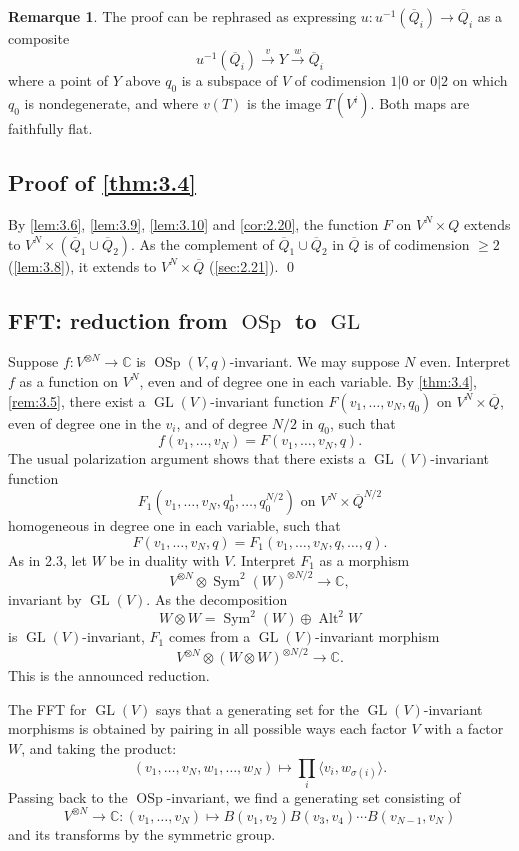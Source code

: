 \documentclass[11pt,a4paper]{article}
\theoremstyle{plain}
\theoremstyle{definition}
\newtheorem{remark}[theorem]{Remarque}
\DeclareMathOperator{\GL}{GL}
\DeclareMathOperator{\OSp}{OSp}
\DeclareMathOperator{\Alt}{Alt}
\DeclareMathOperator{\Sym}{Sym}
\newcommand{\C}{\mathbb{C}}
\begin{document}
\begin{remark}\label{rem:3.11}
The proof can be rephrased as expressing $u: u^{-1}(\overline{Q}_i) \to \overline{Q}_i$ as a composite
\[
u^{-1}(\overline{Q}_i) \xrightarrow{v} Y \xrightarrow{w} \overline{Q}_i
\]
where a point of $Y$ above $q_0$ is a subspace of $V$ of codimension $1|0$ or $0|2$ on which $q_0$ is nondegenerate, and where $v(T)$ is the image $T(V^i)$. Both maps are faithfully flat.
\end{remark}

\subsection{Proof of \ref{thm:3.4}}
\label{sec:3.12}
By \ref{lem:3.6}, \ref{lem:3.9}, \ref{lem:3.10} and \ref{cor:2.20}, the function $F$ on $V^N \times Q$ extends to $V^N \times (\overline{Q}_1 \cup \overline{Q}_2)$. As the complement of $\overline{Q}_1 \cup \overline{Q}_2$ in $\overline{Q}$ is of codimension $\geq 2$ (\ref{lem:3.8}), it extends to $V^N \times \overline{Q}$ (\ref{sec:2.21}).
\qed

\subsection{FFT: reduction from $\OSp$ to $\GL$}
\label{sec:3.13}
Suppose $f : V^{\otimes N} \to \C$ is $\OSp(V,q)$-invariant. We may suppose $N$ even. Interpret $f$ as a function on $V^N$, even and of degree one in each variable. By \ref{thm:3.4}, \ref{rem:3.5}, there exist a $\GL(V)$-invariant function $F(v_1,\dots,v_N, q_0)$ on $V^N \times \overline{Q}$, even of degree one in the $v_i$, and of degree $N/2$ in $q_0$, such that
\[
f(v_1,\dots,v_N) = F(v_1,\dots,v_N, q).
\]
The usual polarization argument shows that there exists a $\GL(V)$-invariant function
\[
F_1(v_1,\dots,v_N, q_0^1,\dots,q_0^{N/2}) \text{ on } V^N \times \overline{Q}^{N/2}
\]
homogeneous in degree one in each variable, such that
\[
F(v_1,\dots,v_N, q) = F_1(v_1,\dots,v_N, q, \dots, q).
\]
As in 2.3, let $W$ be in duality with $V$. Interpret $F_1$ as a morphism
\[
V^{\otimes N} \otimes \Sym^2(W)^{\otimes N/2} \to \C,
\]
invariant by $\GL(V)$. As the decomposition
\[
W \otimes W = \Sym^2(W) \oplus \Alt^2 W
\]
is $\GL(V)$-invariant, $F_1$ comes from a $\GL(V)$-invariant morphism
\[
V^{\otimes N} \otimes (W \otimes W)^{\otimes N/2} \to \C.
\]
This is the announced reduction.

The FFT for $\GL(V)$ says that a generating set for the $\GL(V)$-invariant morphisms is obtained by pairing in all possible ways each factor $V$ with a factor $W$, and taking the product:
\[
(v_1,\dots,v_N, w_1,\dots,w_N) \mapsto \prod_i \langle v_i, w_{\sigma(i)} \rangle.
\]
Passing back to the $\OSp$-invariant, we find a generating set consisting of
\[
V^{\otimes N} \to \C : (v_1,\dots,v_N) \mapsto B(v_1,v_2) B(v_3,v_4) \cdots B(v_{N-1}, v_N)
\]
and its transforms by the symmetric group.
\end{document}

